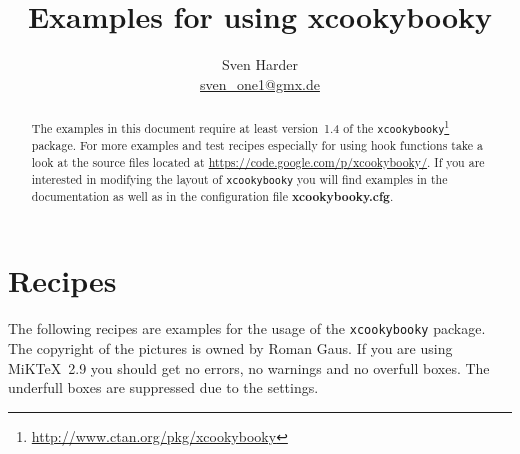 \documentclass[%
a4paper,
11pt
]{article}
\begin{document}
\title{Examples for using \textbf{xcookybooky}}
\author{Sven Harder\\ \href{mailto:sven\_one1@gmx.de}{sven\_one1@gmx.de}}
\maketitle

\begin{abstract}
    \noindent The examples in this document require at least version~1.4 of the \texttt{xcookybooky}\footnote{\url{http://www.ctan.org/pkg/xcookybooky}} package. For more examples and test recipes especially for using hook functions take a look at the source files located at \url{https://code.google.com/p/xcookybooky/}. If you are interested in modifying the layout of \texttt{xcookybooky} you will find examples in the documentation as well as in the configuration file \textbf{xcookybooky.cfg}.
\end{abstract}

\tableofcontents

\vspace{5em}

\section{Recipes}
The following recipes are examples for the usage of the \texttt{xcookybooky} package. The copyright of the pictures is owned by Roman Gaus. If you are using MiKTeX~2.9 you should get no errors, no warnings and no overfull boxes. The underfull boxes are suppressed due to the settings.





\end{document}
